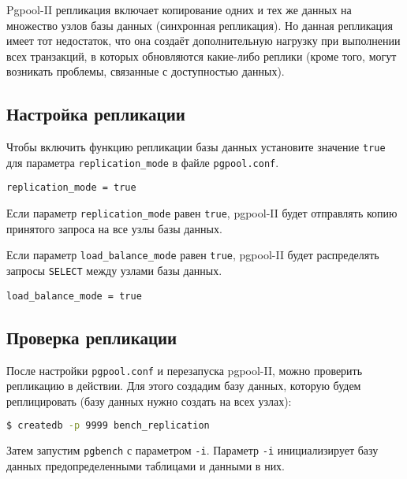 Pgpool-II репликация включает копирование одних и тех же данных на множество узлов базы данных (синхронная репликация). Но данная репликация имеет тот недостаток, что она создаёт дополнительную нагрузку при выполнении всех транзакций, в которых обновляются какие-либо реплики (кроме того, могут возникать проблемы, связанные с доступностью данных).

\subsection{Настройка репликации}

Чтобы включить функцию репликации базы данных установите значение \lstinline!true! для параметра \lstinline!replication_mode! в файле \lstinline!pgpool.conf!.

\begin{lstlisting}[label=lst:pgpool17,caption=Настройка репликации]
replication_mode = true
\end{lstlisting}

Если параметр \lstinline!replication_mode! равен \lstinline!true!, pgpool-II будет отправлять копию принятого запроса на все узлы базы данных.

Если параметр \lstinline!load_balance_mode! равен \lstinline!true!, pgpool-II будет распределять запросы \lstinline!SELECT! между узлами базы данных.

\begin{lstlisting}[label=lst:pgpool18,caption=Настройка репликации]
load_balance_mode = true
\end{lstlisting}

\subsection{Проверка репликации}

После настройки \lstinline!pgpool.conf! и перезапуска pgpool-II, можно проверить репликацию в действии. Для этого создадим базу данных, которую будем реплицировать (базу данных нужно создать на всех узлах):

\begin{lstlisting}[language=Bash,label=lst:pgpool19,caption=Проверка репликации]
$ createdb -p 9999 bench_replication
\end{lstlisting}

Затем запустим \lstinline!pgbench! с параметром \lstinline!-i!. Параметр \lstinline!-i! инициализирует базу данных предопределенными таблицами и данными в них.

